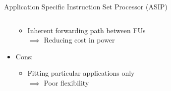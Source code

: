 \documentclass{beamer}
\begin{document}
\begin{CJK}{UTF8}{bkai}
\begin{frame}{Application Specific Instruction Set Processor (ASIP)}
\begin{columns}
\begin{column}{0.6\textwidth}
\begin{itemize}
\begin{itemize}
                           \item Inherent forwarding path between FUs \\ $\implies$ Reducing cost in power
                       \end{itemize}
                   \item Cons:
                       \begin{itemize}
                           \item Fitting particular applications only \\ $\implies$ Poor flexibility
                       \end{itemize}
               \end{itemize} 
            \end{column}
        \end{columns} 
    \end{frame}


\end{CJK}
\end{document}
